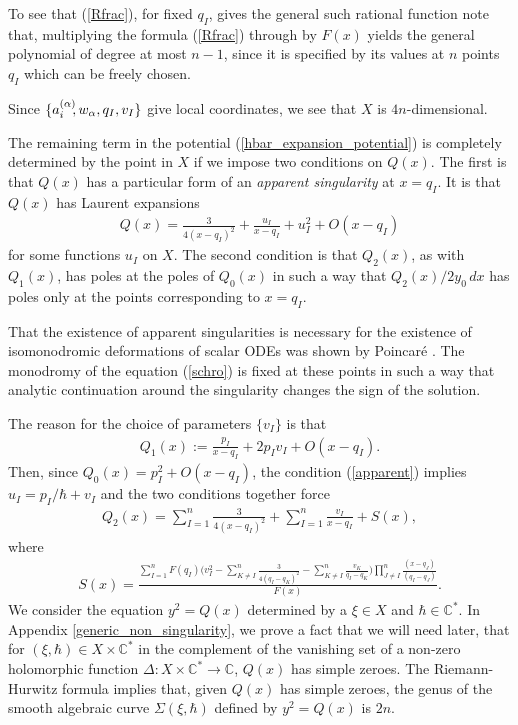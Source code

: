 \documentclass[a4paper,12pt,reqno]{amsart}
\numberwithin{equation}{section}
\numberwithin{counter2}{section}
\begin{document}
To see that (\ref{Rfrac}),  for fixed $q_I$,  gives the general such rational function note that,  multiplying the formula (\ref{Rfrac}) through by $F(x)$ yields the general polynomial of degree at most $n-1$,  since it is specified by its values at $n$ points $q_I$ which can be freely chosen. \par 
Since $\{a_{i}^{(\alpha)}\hspace{-1mm},w_\alpha,  q_I,  v_I\}$ give local coordinates,  we see that $X$ is $4n$-dimensional.  \par 

The remaining term in the potential (\ref{hbar_expansion_potential}) is completely determined by the point in $X$ if we impose two conditions on $Q(x)$.  The first is that $Q(x)$ has a particular form of an \textit{apparent singularity} at $x = q_I$.  It is that $Q(x)$ has Laurent expansions
\begin{align}\label{apparent}
Q(x) = \frac{3}{4(x-q_I)^2} + \frac{u_I}{x-q_I} + u_I^2 + O(x-q_I)
\end{align}
for some functions $u_I$ on $X$.  The second condition is that $Q_2(x)$,  as with $Q_1(x)$,  has poles at the poles of $Q_0(x)$ in such a way that $Q_2(x)/2y_0 \,  dx$ has poles only at  the points corresponding to $x = q_I$.  \par 
That the existence of apparent singularities is necessary for the existence of isomonodromic deformations of scalar ODEs was shown by Poincar\'e \cite{Po}. The monodromy of the equation (\ref{schro}) is fixed at these points in such a way that analytic continuation around the singularity changes the sign of the solution.  \par 
The reason for the choice of parameters $\{v_I\}$ is that 
\begin{align}
Q_1(x) := \frac{p_I}{x-q_I} + 2p_Iv_I + O(x-q_I).  
\end{align}
Then,  since $Q_0(x) = p_I^2 + O(x-q_I)$,  the condition (\ref{apparent}) implies $u_I = p_I/\hbar + v_I$ and the two conditions together force
\begin{align}
Q_2(x) = \sum_{I=1}^n \frac{3}{4(x-q_I)^2} +  \sum_{I=1}^n \frac{v_I}{x-q_I} + S(x),  
\end{align}
where
\begin{align}
S(x) = \frac{\displaystyle{{\sum_{I=1}^{n} F(q_I) \Big(v_I^2 - \sum_{K \ne I}^n\frac{3}{4(q_I-q_K)^2} - \sum_{K \ne I}^n \frac{v_K}{q_I-q_K}\Big)\prod_{J \ne I}^n \frac{(x-q_J)}{(q_I-q_J)}}}}{F(x)}.  
\end{align}
We consider the equation $y^2 = Q(x)$ determined by a $\xi \in X$ and $\hbar \in \mathbb{C}^*$.  In Appendix \ref{generic_non_singularity},  we prove a fact that we will need later,  that for $(\xi,\hbar) \in X \times \mathbb{C}^{*}$ in the complement of the vanishing set of a non-zero holomorphic function $\Delta: X \times \mathbb{C}^* \to \mathbb{C}$,  $Q(x)$ has simple zeroes.  The Riemann-Hurwitz formula implies that,  given $Q(x)$ has simple zeroes,  the genus of the smooth algebraic curve $\Sigma(\xi,\hbar)$ defined by $y^2 = Q(x)$ is $2n$.  
\end{document}
